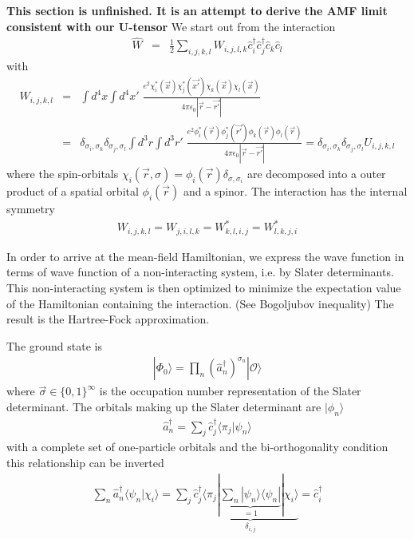 \documentclass[11pt,a4paper]{report}
\begin{document}
\textbf{This section is unfinished. It is an attempt to derive the AMF
  limit consistent with our U-tensor}
We start out from the interaction
\begin{eqnarray}
\hat{W}&=&
\frac{1}{2}\sum_{i,j,k,l}W_{i,j,l,k} 
\hat{c}^\dagger_i\hat{c}^\dagger_j\hat{c}_k\hat{c}_l
\end{eqnarray}
with 
\begin{eqnarray}
W_{i,j,k,l}&=&
\int d^4x\int d^4x'\; \frac{e^2
\chi_i^*(\vec{x})\chi_j^*(\vec{x'})\chi_k(\vec{x})\chi_l(\vec{x})}
{4\pi\epsilon_0|\vec{r}-\vec{r'}|}
\nonumber\\
&=&
\delta_{\sigma_i,\sigma_k}
\delta_{\sigma_j,\sigma_l}
\int d^3r\int d^3r'\; \frac{e^2
\phi_i^*(\vec{r})\phi_j^*(\vec{r'})\phi_k(\vec{r})\phi_l(\vec{r})}
{4\pi\epsilon_0|\vec{r}-\vec{r'}|}
=\delta_{\sigma_i,\sigma_k}
\delta_{\sigma_j,\sigma_l}
U_{i,j,k,l}
\end{eqnarray}
where the spin-orbitals
$\chi_i(\vec{r},\sigma)=\phi_i(\vec{r})\delta_{\sigma,\sigma_i}$ are
decomposed into a outer product of a spatial orbital $\phi_i(\vec{r})$
and a spinor. The interaction has the internal symmetry
\begin{eqnarray}
W_{i,j,k,l}=W_{j,i,l,k}=W^*_{k,l,i,j}=W^*_{l,k,j,i}
\end{eqnarray}

In order to arrive at the mean-field Hamiltonian, we express the wave
function in terms of wave function of a non-interacting system,
i.e. by Slater determinants. This non-interacting system is then
optimized to minimize the expectation value of the Hamiltonian
containing the interaction. (See Bogoljubov inequality) The result is
the Hartree-Fock approximation.

The ground state is
\begin{eqnarray}
|\Phi_0\rangle=
\prod_n \left(\hat{a}_n^\dagger\right)^{\sigma_n}|\mathcal{O}\rangle
\end{eqnarray}
where $\vec{\sigma}\in\{0,1\}^\infty$ is the occupation number
representation of the Slater determinant.  The orbitals making up the
Slater determinant are $|\phi_n\rangle$
\begin{eqnarray}
\hat{a}_n^\dagger=\sum_j\hat{c}^\dagger_j\langle\pi_j|\psi_n\rangle
\end{eqnarray}
with a complete set of one-particle orbitals and the bi-orthogonality
condition this relationship can be inverted
\begin{eqnarray}
\sum_n\hat{a}_n^\dagger\langle\psi_n|\chi_i\rangle
=\sum_j\hat{c}^\dagger_j
\underbrace{\langle\pi_j|
\underbrace{\sum_n|\psi_n\rangle\langle\psi_n|}_{=1}|\chi_i\rangle}_{\delta_{i,j}}
=\hat{c}^\dagger_i
\end{eqnarray}
\end{document}
